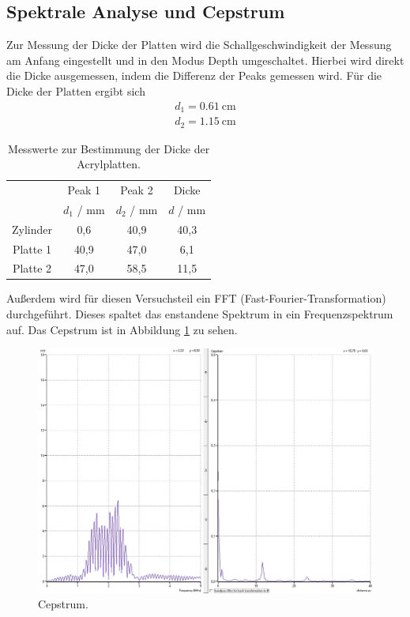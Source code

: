 \subsection{Spektrale Analyse und Cepstrum}
Zur Messung der Dicke der Platten wird die Schallgeschwindigkeit der Messung am Anfang eingestellt und in den Modus Depth umgeschaltet. Hierbei wird direkt
die Dicke ausgemessen, indem die Differenz der Peaks gemessen wird. Für die Dicke der Platten ergibt sich
\begin{align*}
  d_1 = \SI{0,61}{\centi\meter} \\
  d_2 = \SI{1,15}{\centi\meter}
\end{align*}

\begin{table}
  \centering
  \caption{Messwerte zur Bestimmung der Dicke der Acrylplatten.}
  \label{tab:4}
  \begin{tabular}{c c c c}
    \toprule
    & Peak 1 & Peak 2 & Dicke \\
    & $d_1$ / \si{\milli\meter} & $d_2$ / \si{\milli\meter} & $d$ / \si{\milli\meter} \\
    \midrule
    Zylinder & 0,6 & 40,9 & 40,3 \\
    Platte 1 & 40,9 & 47,0 & 6,1 \\
    Platte 2 & 47,0 & 58,5 & 11,5 \\
    \bottomrule
  \end{tabular}
\end{table}

Außerdem wird für diesen Versuchsteil ein FFT (Fast-Fourier-Transformation) durchgeführt. Dieses spaltet das enstandene Spektrum in
ein Frequenzspektrum auf. Das Cepstrum ist in Abbildung \ref{abb:5} zu sehen.
\begin{figure}
  \centering
  \includegraphics[scale=0.3]{Cepstrum.png}
  \caption{Cepstrum.}
  \label{abb:5}
\end{figure}

